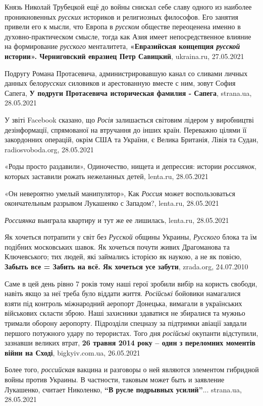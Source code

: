 Князь Николай Трубецкой ещё до войны снискал себе славу одного из наиболее
проникновенных \emph{русских} историков и религиозных философов. Его занятия
привели его к мысли, что Европа в \emph{русском} обществе переоценена именно в
духовно-практическом смысле, тогда как Азия имеет непосредственное влияние на
формирование \emph{русского} менталитета, \textbf{«Евразийская концепция
\emph{русской} истории». Черниговский евразиец Петр Савицкий}, ukraina.ru,
27.05.2021

Подругу Романа Протасевича, администрировавшую канал со сливами личных данных
бело\emph{русских} силовиков и арестованную вместе с ним, зовут София Сапега,
\textbf{У подруги Протасевича историческая фамилия - Сапега}, strana.ua,
28.05.2021

У звіті Facebook сказано, що \emph{Росія} залишається світовим лідером у
виробництві дезінформації, спрямованої на втручання до інших країн. Переважно
цілями її закордонних операцій, окрім США та України, є Велика Британія, Лівія
та Судан, radiosvoboda.org, 28.05.2021

«Роды просто раздавили», Одиночество, нищета и депрессия: истории
\emph{россиянок}, которых заставили рожать нежеланных детей, lenta.ru,
28.05.2021

«Он невероятно умелый манипулятор», Как \emph{Россия} может воспользоваться
окончательным разрывом Лукашенко с Западом?, lenta.ru, 28.05.2021

\emph{Россиянка} выиграла квартиру и тут же ее лишилась, lenta.ru, 28.05.2021

Як хочеться потрапити у світ без \emph{Русской} общины Украины, \emph{Русского}
блока та їм подібних московських шавок.  Як хочеться почути живих Драгоманова
та Ключевського; тих людей, які займались історією як наукою, а не як повією,
\textbf{Забыть все = Забить на всё. Як хочеться усе забути}, zrada.org,
24.07.2010

Саме в цей день рівно 7 років тому наші герої зробили вибір на користь свободи,
навіть якщо за неї треба було віддати життя. \emph{Російські} бойовики
намагалися взяти під контроль міжнародний аеропорт Донецька, вимагали в
українських військових скласти зброю. Наші захисники здаватися не збиралися та
мужньо тримали оборону аеропорту. Підрозділи спецназу за підтримки авіації
завдали першого потужного удару по терористах. Того дня \emph{російські}
окупанти відступили, зазнавши великих втрат, \textbf{26 травня 2014 року – один
з переломних моментів війни на Сході}, bigkyiv.com.ua, 26.05.2021

Более того, \emph{российская} вакцина и разговоры о ней являются элементом
гибридной войны против Украины. В частности, таковым может быть и заявление
Лукашенко, считает Николенко, \textbf{\enquote{В русле подрывных усилий}}...
strana.ua, 28.05.2021

